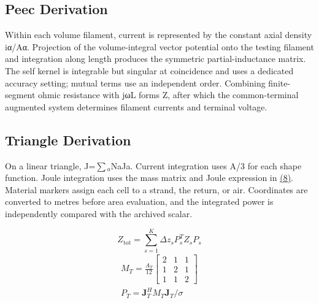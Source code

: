 \documentclass[11pt]{article}
\begin{document}
\subsection*{Peec Derivation}
\hypertarget{S1.peec_derivation.heading}{}
Within each volume filament, current is represented by the constant axial density iα/Aα. Projection of the volume-integral vector potential onto the testing filament and integration along length produces the symmetric partial-inductance matrix. The self kernel is integrable but singular at coincidence and uses a dedicated accuracy setting; mutual terms use an independent order. Combining finite-segment ohmic resistance with jωL forms Z, after which the common-terminal augmented system determines filament currents and terminal voltage.


\subsection*{Triangle Derivation}
\hypertarget{S1.triangle_derivation.heading}{}
On a linear triangle, J=\(\sum\)\(_a\)NaJa. Current integration uses A/3 for each shape function. Joule integration uses the mass matrix and Joule expression in \href{paper_en_single.pdf#E09}{(8)}. Material markers assign each cell to a strand, the return, or air. Coordinates are converted to metres before area evaluation, and the integrated power is independently compared with the archived scalar.


\hypertarget{E06}{}\begin{equation}Z_{\mathrm{tot}}=\sum_{s=1}^{K}\Delta z_s P_s^T Z_s P_s\tag{7}\label{eq:E06}\end{equation}
\hypertarget{E09}{}
\begin{equation}
\begin{gathered}
M_T=\frac{A_T}{12}\begin{bmatrix}2&1&1\\1&2&1\\1&1&2\end{bmatrix} \\
P_T=\mathbf J_T^H M_T\mathbf J_T/\sigma
\end{gathered}
\tag{8}\label{eq:E09}
\end{equation}
\end{document}
